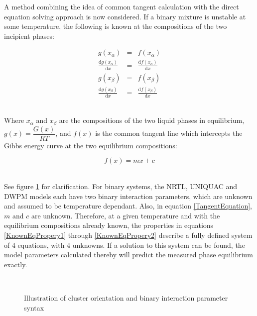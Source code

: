 A method combining the idea of common tangent calculation with the direct equation solving approach is now considered. If a binary mixture is unstable at some temperature,  the following is known at the compositions of the two incipient phases:\

\begin{eqnarray}
g\left(x_{\alpha}\right) &=& f\left(x_{\alpha}\right) \label{KnownEqPropery1}\\
\frac{\mathrm{d}g\left(x_{\alpha}\right)}{\mathrm{d}x} &=& \frac{\mathrm{d}f\left(x_{\alpha}\right)}{\mathrm{d}x}\\
g\left(x_{\beta}\right) &=& f\left(x_{\beta}\right)\\
\frac{\mathrm{d}g\left(x_{\beta}\right)}{\mathrm{d}x} &=& \frac{\mathrm{d}f\left(x_{\beta}\right)}{\mathrm{d}x}\label{KnownEqPropery2} 
\end{eqnarray}\

Where $x_{\alpha}$ and $x_{\beta}$ are the compositions of the two liquid phases in equilibrium, $g\left(x\right) = \dfrac{G\left(x\right)}{RT}$, and $f\left(x\right)$ is the common tangent line which intercepts the Gibbs energy curve at the two equilibrium compositions:\

\begin{equation}
f\left(x\right) = mx + c \label{TangentEquation}
\end{equation}\

See figure \ref{BinaryParameterPAMethodDrawing} for clarification. For binary systems, the NRTL, UNIQUAC and DWPM models each have two binary interaction parameters, which are unknown and assumed to be temperature dependant. Also, in equation \ref{TangentEquation}, $m$ and $c$ are unknown. Therefore, at a given temperature and with the equilibrium compositions already known, the properties in equations \ref{KnownEqPropery1} through \ref{KnownEqPropery2} describe a fully defined system of 4 equations, with 4 unknowns. If a solution to this system can be found, the model parameters calculated thereby will predict the measured phase equilibrium exactly.\\

\begin{figure}[t]
\begin{center}
\resizebox{0.7\textwidth}{!}{}\\
\end{center}
\caption{Illustration of cluster orientation and binary interaction parameter syntax} \label{BinaryParameterPAMethodDrawing}
\end{figure}	

